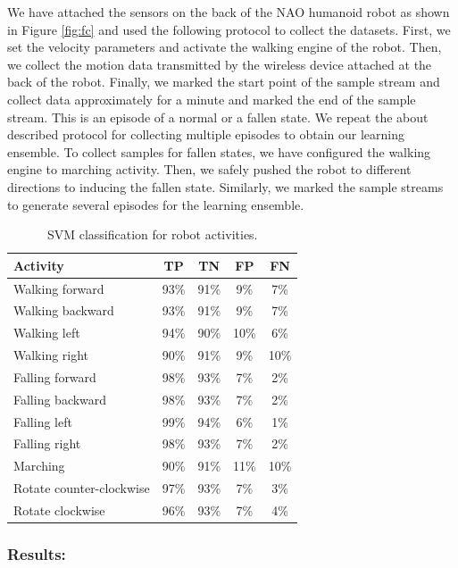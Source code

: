 \documentclass[letterpaper]{article}
\begin{document}
\begin{sloppy}
We have attached the sensors on the back of the NAO humanoid robot as shown in Figure \ref{fig:fc} 
and used the following protocol to collect the datasets. First, we set the velocity 
parameters and activate the walking engine of the robot. Then, we collect the motion data 
transmitted by the wireless device attached at the back of the robot. Finally, we marked the start 
point of the sample stream and collect data approximately for a minute and marked the end of the 
sample stream. This is an episode of a normal  or a fallen state. We repeat the about described 
protocol for collecting multiple episodes to obtain our learning ensemble. To collect samples for 
fallen states, we have configured the walking engine to marching activity. Then, we safely pushed 
the robot to different directions to inducing the fallen state. Similarly, we marked the sample 
streams to generate several episodes for the learning ensemble.    

\begin{table}[!ht]
\caption{SVM classification for robot activities.}
	\label{tab:robot-svm-class}
	\centering
		\begin{tabular} {| l | c | c | c | c | }
		\hline
			{\bf Activity} & {\bf  TP}  &	{\bf TN}  &	{\bf FP} &	{\bf FN} \\ 
\hline
			Walking forward	& 93\%	& 91\%	& 9\%	& 7\% \\ \hline
			Walking backward	& 93\%	& 91\%	& 9\%	& 7\% \\ \hline
			Walking left	& 94\%	& 90\%	& 10\%	& 6\% \\ \hline
			Walking right	& 90\%	& 91\%	& 9\%	& 10\% \\ \hline
			Falling forward	& 98\%	& 93\%	& 7\%	& 2\%	 \\ \hline
			Falling backward	& 98\%	& 93\%	& 7\%	& 2\%	 \\ \hline
			Falling left	& 99\%	& 94\%	& 6\%	& 1\%	 \\ \hline
			Falling right	& 98\%	& 93\%	& 7\%	& 2\%	 \\ \hline
			Marching	& 90\%	& 91\%	& 11\%	& 10\%	 \\ \hline
			Rotate counter-clockwise	& 97\%	& 93\%	& 7\%	& 3\%	 \\ \hline
			Rotate clockwise	& 96\%	& 93\%	& 7\%	& 4\%	 \\ \hline
		\end{tabular}
\end{table}


\subsubsection{Results:}


\end{sloppy}
\end{document}
